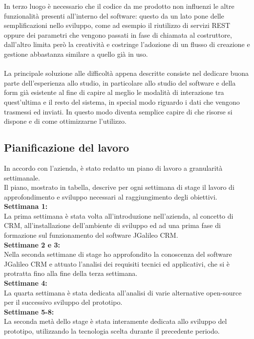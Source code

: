 In terzo luogo è necessario che il codice da me prodotto non influenzi le altre funzionalità presenti all'interno del software: questo da un lato pone delle semplificazioni nello sviluppo, come ad esempio il riutilizzo di servizi REST oppure dei parametri che vengono passati in fase di chiamata al costruttore, dall'altro limita però la creatività e costringe l'adozione di un flusso di creazione e gestione abbastanza similare a quello già in uso.\\
\\
La principale soluzione alle difficoltà appena descritte consiste nel dedicare buona parte dell'esperienza allo studio, in particolare allo studio del software e della form già esistente al fine di capire al meglio le modalità di interazione tra quest'ultima e il resto del sistema, in special modo riguardo i dati che vengono trasmessi ed inviati. In questo modo diventa semplice capire di che risorse si dispone e di come ottimizzarne l'utilizzo.\\



\subsection{Pianificazione del lavoro}
In accordo con l'azienda, è stato redatto un piano di lavoro a granularità settimanale. \\
Il piano, mostrato in tabella, descrive per ogni settimana di stage il lavoro di approfondimento e sviluppo necessari al raggiungimento degli obiettivi.\\%

\textbf{Settimana 1:}\\
La prima settimana è stata volta all'introduzione nell'azienda, al concetto di CRM, all'installazione dell'ambiente di sviluppo ed ad una prima fase di formazione sul funzionamento del software JGalileo CRM.\\
\textbf{Settimane 2 e 3:}\\
Nella seconda settimane di stage ho approfondito la conoscenza del software JGalileo CRM e attuato l'analisi dei requisiti tecnici ed applicativi, che si è protratta fino alla fine della terza settimana.\\
\textbf{Settimane 4:}\\
La quarta settimana è stata dedicata all'analisi di varie alternative open-source per il successivo sviluppo del prototipo. \\
\textbf{Settimane 5-8:}\\
La seconda metà dello stage è stata interamente dedicata allo sviluppo del prototipo, utilizzando la tecnologia scelta durante il precedente periodo.\\

